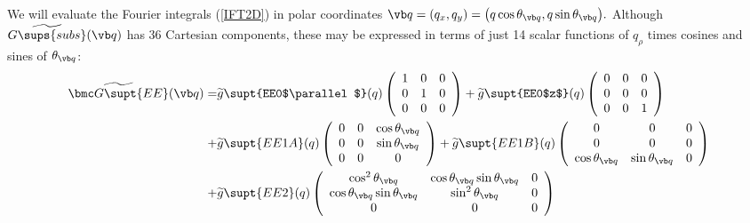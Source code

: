 \documentclass[letterpaper]{article}
\renewcommand{\wt}{\widetilde}
\begin{document}
We will evaluate the Fourier integrals (\ref{IFT2D})
in polar coordinates 
$\vb q=(q_x,q_y)=\big(q \cos\theta_{\vb q}, q\sin\theta_{\vb q}\big).$
Although $\wt{G\sups{subs}}(\vb q)$ has 36 Cartesian components,
these may be expressed in terms of just 14 scalar functions
of $q_\rho$ times cosines and sines of $\theta_{\vb q}$:
\begin{align*}
 \wt{\bmc G\supt{EE}}(\vb q)
 = &\wt{g}\supt{EE0$\parallel$}(q)
    \left(\begin{array}{ccc}
    1 & 0 & 0 \\ 
    0 & 1 & 0 \\ 
    0 & 0 & 0 \\ 
   \end{array}\right)
  + \wt{g}\supt{EE0$z$}(q)
    \left(\begin{array}{ccc}
    0 & 0 & 0 \\ 
    0 & 0 & 0 \\ 
    0 & 0 & 1 \\ 
   \end{array}\right)
\\
 + &\wt{g}\supt{EE1A}(q)
   \left(\begin{array}{ccc}
    0                     & 0                   & \cos\theta_{\vb q} \\
    0                     & 0                   & \sin\theta_{\vb q} \\
    0                     & 0                   & 0 
   \end{array}\right)
 + \wt{g}\supt{EE1B}(q)
   \left(\begin{array}{ccc}
    0                     & 0                   & 0 \\
    0                     & 0                   & 0 \\
    \cos\theta_{\vb q}    & \sin\theta_{\vb q}  & 0 
   \end{array}\right)
\\
  +&\wt{g}\supt{EE2}(q)
   \left(\begin{array}{ccc}
    \cos^2\theta_{\vb q}  & \cos\theta_{\vb q} \sin\theta_{\vb q} & 0 \\
    \cos\theta_{\vb q} \sin\theta_{\vb q} & \sin^2\theta_{\vb q}  & 0 \\
    0                     & 0                    & 0 
   \end{array}\right)
\\[10pt]

\end{align*}
\end{document}
